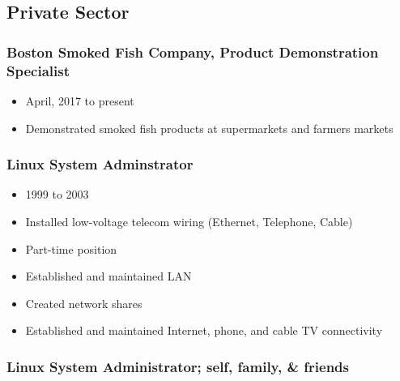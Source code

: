 \documentclass[12pt]{article}
\begin{document}
\subsection{Private Sector}

\subsubsection{Boston Smoked Fish Company, Product Demonstration Specialist}
\begin{itemize}
\item
  April, 2017 to present
\item
  Demonstrated smoked fish products at supermarkets and farmers markets
\end{itemize}

\subsubsection{Linux System Adminstrator}

\begin{itemize}
\item 1999 to 2003
\item
  Installed low-voltage telecom wiring (Ethernet, Telephone, Cable)
\item
  Part-time position
\item
  Established and maintained LAN
\item
  Created network shares
\item
  Established and maintained Internet, phone, and cable TV connectivity
\end{itemize}

\subsubsection{Linux System Administrator; self, family, \&
friends}
\end{document}
